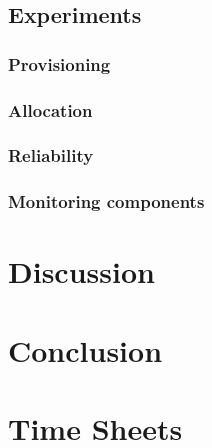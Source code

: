 \documentclass[a4paper]{IEEEtran}
\begin{document}



\subsection{Experiments}
\subsubsection{Provisioning}

\subsubsection{Allocation}

\subsubsection{Reliability}

\subsubsection{Monitoring components}


\section{Discussion}

\section{Conclusion}





\appendix
\section{Time Sheets}
\end{document}
